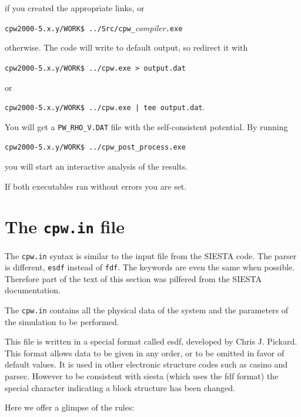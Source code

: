 \documentclass[11pt]{article}
\begin{document}
if you created the appropriate links, or

\noindent\texttt{cpw2000-5.x.y/WORK\$ ../Src/cpw{\_}}\textit{compiler}\texttt{.exe}

otherwise.   The code will write to default output, so redirect it with

\noindent\texttt{cpw2000-5.x.y/WORK\$ ../cpw.exe > output.dat}

or

\noindent\texttt{cpw2000-5.x.y/WORK\$ ../cpw.exe | tee output.dat}.

You will get a \texttt{PW{\_}RHO{\_}V.DAT} file with the self-consistent potential.  By running

\noindent\texttt{cpw2000-5.x.y/WORK\$ ../cpw{\_}post{\_}process.exe}

you will start an interactive analysis of the results.

If both executables ran without errors you are set.

\section{The \texttt{cpw.in} file}

The \texttt{cpw.in} syntax is similar to the input file from the SIESTA code.
The parser is different, \texttt{esdf} instead of \texttt{fdf}.  The keywords
are even the same when possible.  Therefore part of the text of this section
was pilfered from the SIESTA documentation.

The \texttt{cpw.in}
contains all the physical data of the system and the parameters of
the simulation to be performed.

This file is written in a special format called {\sc esdf}, developed by
Chris J. Pickard. This format allows data to be
given in any order, or to be omitted in favor of default values.
It is used in other electronic structure codes such as {\sc casino} and
{\sc parsec}.   However to be consistent with {\sc siesta} (which uses the fdf format) the special character
indicating a block structure has been changed.

Here we offer a glimpse of the rules:
\end{document}
